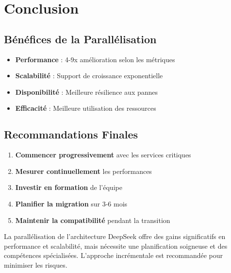 \documentclass[12pt,a4paper]{article}
\begin{document}
\section{Conclusion}

\subsection{Bénéfices de la Parallélisation}
\begin{itemize}
\item \textbf{Performance} : 4-9x amélioration selon les métriques
\item \textbf{Scalabilité} : Support de croissance exponentielle
\item \textbf{Disponibilité} : Meilleure résilience aux pannes
\item \textbf{Efficacité} : Meilleure utilisation des ressources
\end{itemize}

\subsection{Recommandations Finales}
\begin{enumerate}
\item \textbf{Commencer progressivement} avec les services critiques
\item \textbf{Mesurer continuellement} les performances
\item \textbf{Investir en formation} de l'équipe
\item \textbf{Planifier la migration} sur 3-6 mois
\item \textbf{Maintenir la compatibilité} pendant la transition
\end{enumerate}

La parallélisation de l'architecture DeepSeek offre des gains significatifs en performance et scalabilité, mais nécessite une planification soigneuse et des compétences spécialisées. L'approche incrémentale est recommandée pour minimiser les risques.
\end{document}
